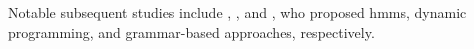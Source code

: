 

Notable subsequent studies include
\textcite{raphael2004functional},
\textcite{illescas2007harmonic}, and
\textcite{magalhaes2011functional}, who proposed
\glspl{hmm}, dynamic programming, and grammar-based
approaches, respectively.


